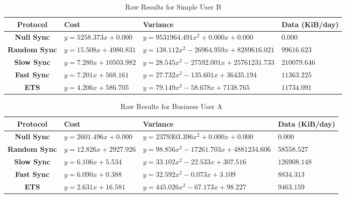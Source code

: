 \begin{table}[htdp]
\begin{center}
\begin{tabular}{|c|l|l|l|}
\hline
\tiny\textbf{Protocol} &  \tiny\textbf{Cost} & \tiny\textbf{Variance} & \tiny\textbf{Data (KiB/day)} \\
\hline
\tiny\textbf{Null Sync} & \tiny$y=5258.373x+0.000$ & \tiny$y=9531964.491x^2+0.000x+0.000$ & \tiny$0.000$ \\
\hline
\tiny\textbf{Random Sync} & \tiny$y=15.508x+4980.831$ & \tiny$y=138.112x^2-26964.959x+8289616.021$ & \tiny$99616.623$ \\
\hline
\tiny\textbf{Slow Sync} & \tiny$y=7.280x+10503.982$ & \tiny$y=28.545x^2-27592.001x+25761231.733$ & \tiny$210079.646$ \\
\hline
\tiny\textbf{Fast Sync} & \tiny$y=7.201x+568.161$ & \tiny$y=27.732x^2-135.601x+36435.194$ & \tiny$11363.225$ \\
\hline
\tiny\textbf{ETS} & \tiny$y=4.206x+586.705$ & \tiny$y=79.149x^2-58.678x+7138.765$ & \tiny$11734.091$ \\
\hline
\end{tabular}
\end{center}
\caption{Raw Results for Simple User B}
\label{simple_b:rawresults}
\end{table}


\begin{table}[htdp]
\begin{center}
\begin{tabular}{|c|l|l|l|}
\hline
\tiny\textbf{Protocol} &  \tiny\textbf{Cost} & \tiny\textbf{Variance} & \tiny\textbf{Data (KiB/day)} \\
\hline
\tiny\textbf{Null Sync} & \tiny$y=2601.496x+0.000 $ & \tiny$y=2379303.396x^2+0.000x+0.000 $ & \tiny$0.000$ \\
\hline
\tiny\textbf{Random Sync} & \tiny$y=12.826x+2927.926 $ & \tiny$y=98.856x^2-17261.703x+4881234.606 $ & \tiny$58558.527$ \\
\hline
\tiny\textbf{Slow Sync} & \tiny$y=6.106x+5.534$ & \tiny$y=33.102x^2-22.533x+307.516$ & \tiny$126908.148$ \\
\hline
\tiny\textbf{Fast Sync} & \tiny$y=6.090x+0.388$ & \tiny$y=32.592x^2-0.073x+3.109$ & \tiny$8834.313$ \\
\hline
\tiny\textbf{ETS} & \tiny$y=2.631x+16.581$ & \tiny$y=445.026x^2-67.173x+98.227$ & \tiny$9463.159$ \\
\hline
\end{tabular}
\end{center}
\caption{Raw Results for Business User A}
\label{business_a:rawresults}
\end{table}


